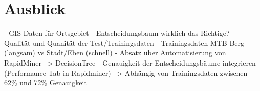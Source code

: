 \chapter{Ausblick}

- GIS-Daten für Ortsgebiet
- Entscheidungsbaum wirklich das Richtige?
- Qualität und Quanität der Test/Trainingsdaten
- Trainingsdaten MTB Berg (langsam) vs Stadt/Eben (schnell)
- Absatz über Automatisierung von RapidMiner --> DecisionTree
- Genauigkeit der Entscheidungsbäume integrieren (Performance-Tab in Rapidminer)
	--> Abhängig von Trainingsdaten zwischen 62\% und 72\% Genauigkeit